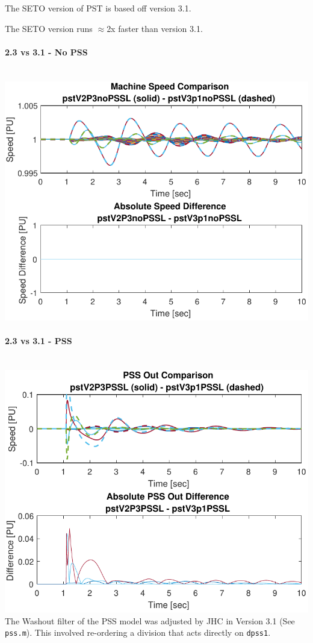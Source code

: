 \documentclass[12pt]{article}
\begin{document}
\begin{landscape}
\begin{multicols}{3}
The SETO version of PST is based off version 3.1.

The SETO version runs $\approx$2x faster than version 3.1.

\vfill\null
\columnbreak
\paragraph{2.3 vs 3.1 - No PSS} \ \\

\includegraphics[width=\linewidth]{pstV2P3noPSSLpstV3p1noPSSL}

\paragraph{2.3 vs 3.1 - PSS} \ \\
\includegraphics[width=\linewidth]{pstV2P3PSSLpstV3p1PSSL}
The Washout filter of the PSS model was adjusted by JHC in Version 3.1 (See \verb|pss.m|).
This involved re-ordering a division that acts directly on \verb|dpss1|.


\end{multicols}
\end{landscape}
\end{document}
